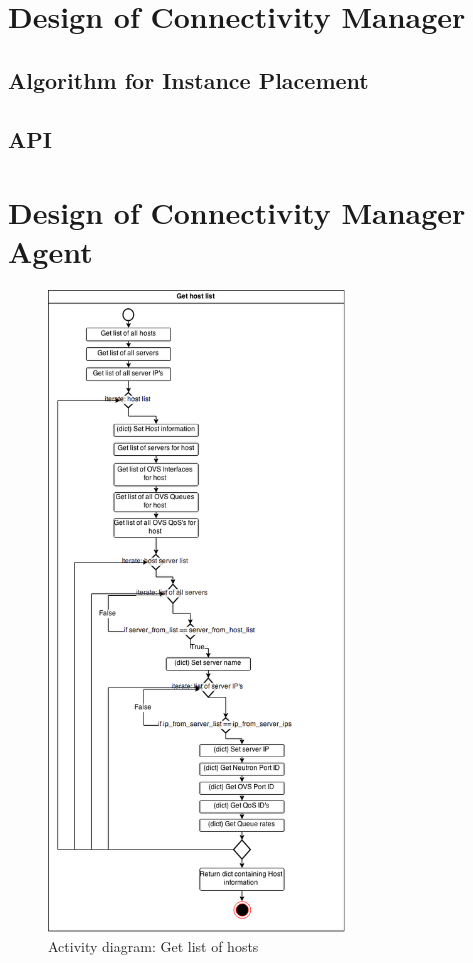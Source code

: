 \section{Design of Connectivity Manager}

\subsection{Algorithm for Instance Placement}

\subsection{API}

\newpage
\section{Design of Connectivity Manager Agent}

\begin{figure}[H]
\centering

\includegraphics[width=0.7\textwidth]{images/design/activity_host_list}

\caption{Activity diagram: Get list of hosts}
\end{figure}

